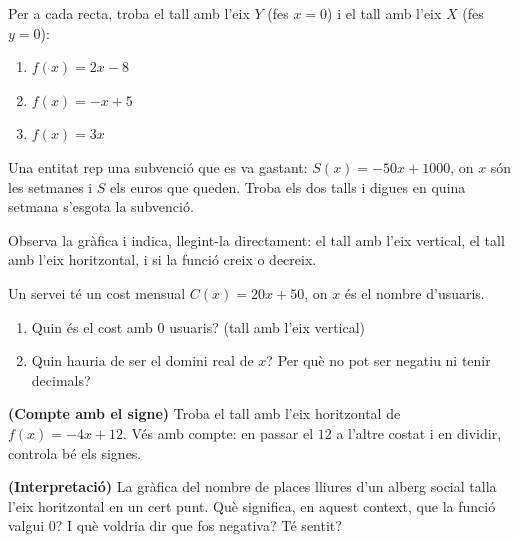 \begin{exercicis}
\begin{exlist}
  \item Per a cada recta, troba el tall amb l'eix $Y$ (fes $x=0$) i el tall amb
        l'eix $X$ (fes $y=0$):
    \begin{enumerate}[label=\alph*), leftmargin=1.6em, topsep=2pt]
      \item $f(x)=2x-8$
      \item $f(x)=-x+5$
      \item $f(x)=3x$
    \end{enumerate}
  \item Una entitat rep una subvenció que es va gastant: $S(x)=-50x+1000$, on $x$
        són les setmanes i $S$ els euros que queden. Troba els dos talls i digues en
        quina setmana s'esgota la subvenció.
  \item Observa la gràfica i indica, llegint-la directament: el tall amb l'eix
        vertical, el tall amb l'eix horitzontal, i si la funció creix o decreix.

        \begin{center}

        \end{center}

  \item Un servei té un cost mensual $C(x)=20x+50$, on $x$ és el nombre d'usuaris.
        \begin{enumerate}[label=\alph*), leftmargin=1.6em, topsep=2pt]
          \item Quin és el cost amb $0$ usuaris? (tall amb l'eix vertical)
          \item Quin hauria de ser el domini real de $x$? Per què no pot ser negatiu
                ni tenir decimals?
        \end{enumerate}
  \item \textbf{(Compte amb el signe)} Troba el tall amb l'eix horitzontal de
        $f(x)=-4x+12$. Vés amb compte: en passar el $12$ a l'altre costat i en
        dividir, controla bé els signes.
  \item \textbf{(Interpretació)} La gràfica del nombre de places lliures d'un alberg
        social talla l'eix horitzontal en un cert punt. Què significa, en aquest
        context, que la funció valgui $0$? I què voldria dir que fos negativa? Té
        sentit?
\end{exlist}
\end{exercicis}

